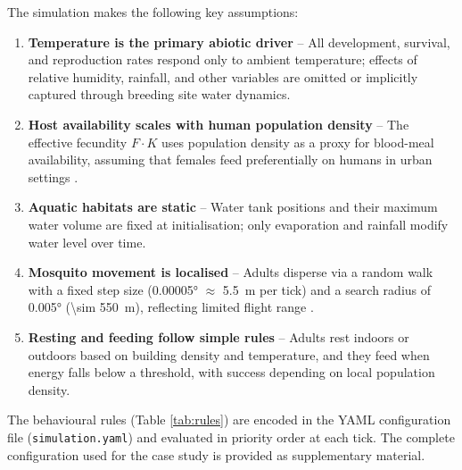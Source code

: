 \documentclass{article}
\begin{document}
The simulation makes the following key assumptions:
\begin{enumerate}  
    \item \textbf{Temperature is the primary abiotic driver} -- All development, survival, and reproduction rates respond 
	only to ambient temperature; effects of relative humidity, rainfall, and other variables are omitted or implicitly 
	captured through breeding site water dynamics.  
    
    \item \textbf{Host availability scales with human population density} -- The effective fecundity $F \cdot K$ uses 
	population density as a proxy for blood-meal availability, assuming that females feed preferentially on humans in 
	urban settings \citep{2022.AH.TPI}.  
    
    \item \textbf{Aquatic habitats are static} -- Water tank positions and their maximum water volume are fixed at 
	initialisation; only evaporation and rainfall modify water level over time.  
    
    \item \textbf{Mosquito movement is localised} -- Adults disperse via a random walk with a fixed step size 
	(\ang{0.00005} $\approx$ \SI{5.5}{\meter} per tick) and a search radius of \ang{0.005} (\SI{\sim 550}{\meter}), 
	reflecting limited flight range \citep{1966.MA.FRL}.  
    
    \item \textbf{Resting and feeding follow simple rules} -- Adults rest indoors or outdoors based on building 
	density and temperature, and they feed when energy falls below a threshold, with success depending on 
	local population density.
\end{enumerate}

The behavioural rules (Table \ref{tab:rules}) are encoded in the YAML configuration file (\texttt{simulation.yaml}) and 
evaluated in priority order at each tick. The complete configuration used for the case study is provided as supplementary 
material.
\end{document}
